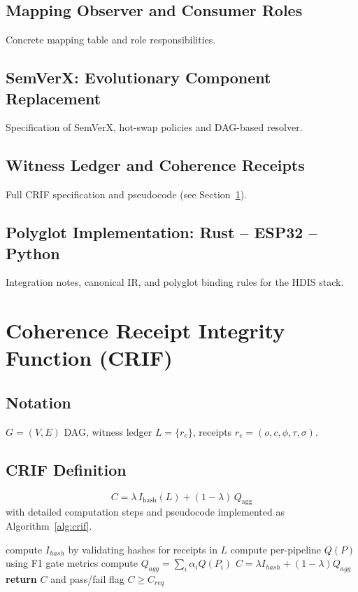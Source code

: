 \documentclass[12pt,a4paper]{article}
\begin{document}
\subsection{Mapping Observer and Consumer Roles}
Concrete mapping table and role responsibilities.

\subsection{SemVerX: Evolutionary Component Replacement}
Specification of SemVerX, hot-swap policies and DAG-based resolver.

\subsection{Witness Ledger and Coherence Receipts}
Full CRIF specification and pseudocode (see Section~\ref{sec:crif}).

\subsection{Polyglot Implementation: Rust -- ESP32 -- Python}
Integration notes, canonical IR, and polyglot binding rules for the HDIS stack.

\section{Coherence Receipt Integrity Function (CRIF)}
\label{sec:crif}

\subsection{Notation}
$G=(V,E)$ DAG, witness ledger $L=\{r_e\}$, receipts $r_e=(o,c,\phi,\tau,\sigma)$.

\subsection{CRIF Definition}
\[ C = \lambda\, I_{\mathrm{hash}}(L) + (1-\lambda)\, Q_{\mathrm{agg}} \]
with detailed computation steps and pseudocode implemented as Algorithm~\ref{alg:crif}.

\begin{algorithm}[H]
\caption{ComputeCRIF}
\label{alg:crif}
\begin{algorithmic}[1]
\State compute $I_{hash}$ by validating hashes for receipts in $L$
\State compute per-pipeline $Q(P)$ using F1 gate metrics
\State compute $Q_{agg}=\sum_i \alpha_i Q(P_i)$
\State $C = \lambda I_{hash} + (1-\lambda) Q_{agg}$
\State \textbf{return} $C$ and pass/fail flag $C \ge C_{req}$
\EndProcedure
\end{algorithmic}
\end{algorithm}
\end{document}
